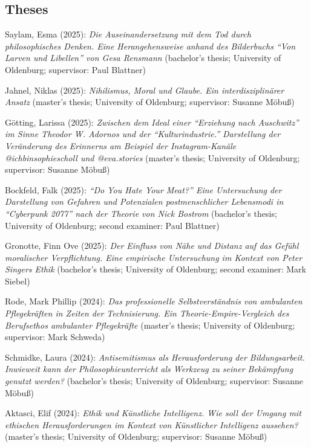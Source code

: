 \documentclass[a4paper,10pt]{article}
\newenvironment{literature}{%
   \parskip6pt\parindent0pt\raggedright
   \def\lititem{\hangindent=1cm\hangafter1}}{%
   \par\ignorespaces}
\begin{document}
\subsection*{Theses}
\begin{literature}
\lititem Saylam, Esma (2025): \textit{Die Auseinandersetzung mit dem Tod durch philosophisches Denken. Eine Herangehensweise anhand des Bilderbuchs \enquote{Von Larven und Libellen} von Gesa Rensmann} (bachelor's thesis; University of Oldenburg; supervisor: Paul Blattner)

\lititem Jahnel, Niklas (2025): \textit{Nihilismus, Moral und Glaube. Ein interdisziplinärer Ansatz} (master's thesis; University of Oldenburg; supervisor: Susanne Möbuß)

\lititem Götting, Larissa (2025): \textit{Zwischen dem Ideal einer \enquote{Erziehung nach Auschwitz} im Sinne Theodor W. Adornos und der \enquote{Kulturindustrie.} Darstellung der Veränderung des Erinnerns am Beispiel der Instagram-Kanäle @ichbinsophiescholl und @eva.stories} (master's thesis; University of Oldenburg; supervisor: Susanne Möbuß)

\lititem Bockfeld, Falk (2025): \textit{\enquote{Do You Hate Your Meat?} Eine Untersuchung der Darstellung von Gefahren und Potenzialen postmenschlicher Lebensmodi in \enquote{Cyberpunk 2077} nach der Theorie von Nick Bostrom} (bachelor's thesis; University of Oldenburg; second examiner: Paul Blattner)

\lititem Gronotte, Finn Ove (2025): \textit{Der Einfluss von Nähe und Distanz auf das Gefühl moralischer Verpflichtung. Eine empirische Untersuchung im Kontext von Peter Singers Ethik} (bachelor's thesis; University of Oldenburg; second examiner: Mark Siebel)

\lititem Rode, Mark Phillip (2024): \textit{Das professionelle Selbstverständnis von ambulanten Pflegekräften in Zeiten der Technisierung. Ein Theorie-Empire-Vergleich des Berufsethos ambulanter Pflegekräfte} (master's thesis; University of Oldenburg; supervisor: Mark Schweda)

\lititem Schmidke, Laura (2024): \textit{Antisemitismus als Herausforderung der Bildungsarbeit. Inwieweit kann der Philosophieunterricht als Werkzeug zu seiner Bekämpfung genutzt werden?} (bachelor's thesis; University of Oldenburg; supervisor: Susanne Möbuß)

\lititem Aktasci, Elif (2024): \textit{Ethik und Künstliche Intelligenz. Wie soll der Umgang mit ethischen Herausforderungen im Kontext von Künstlicher Intelligenz aussehen?} (master's thesis; University of Oldenburg; supervisor: Susanne Möbuß)


\end{literature}
\end{document}
